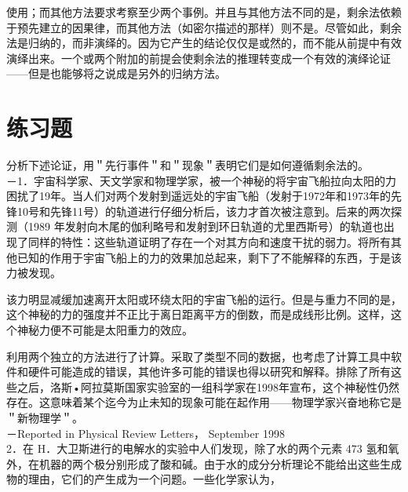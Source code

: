 使用；而其他方法要求考察至少两个事例。并且与其他方法不同的是，剩余法依赖于预先建立的因果律，而其他方法（如密尔描述的那样）则不是。尽管如此，剩余法是归纳的，而非演绎的。因为它产生的结论仅仅是或然的，而不能从前提中有效演绎出来。一个或两个附加的前提会使剩余法的推理转变成一个有效的演绎论证——但是也能够将之说成是另外的归纳方法。

\section*{练习题}
分析下述论证，用＂先行事件＂和＂现象＂表明它们是如何遵循剩余法的。\\
－1．宇宙科学家、天文学家和物理学家，被一个神秘的将宇宙飞船拉向太阳的力困扰了19年。当人们对两个发射到遥远处的宇宙飞船（发射于1972年和1973年的先锋10号和先锋11号）的轨道进行仔细分析后，该力才首次被注意到。后来的两次探测（1989 年发射向木尾的伽利略号和发射到环日轨道的尤里西斯号）的轨道也出现了同样的特性：这些轨道证明了存在一个对其方向和速度干扰的弱力。将所有其他已知的作用于宇宙飞船上的力的效果加总起来，剩下了不能解释的东西，于是该力被发现。

该力明显减缓加速离开太阳或环绕太阳的宇宙飞船的运行。但是与重力不同的是，这个神秘的力的强度并不正比于离日距离平方的倒数，而是成线形比例。这样，这个神秘力便不可能是太阳重力的效应。

利用两个独立的方法进行了计算。采取了类型不同的数据，也考虑了计算工具中软件和硬件可能造成的错误，其他许多可能的错误也得以研究和解释。排除了所有这些之后，洛斯•阿拉莫斯国家实验室的一组科学家在1998年宣布，这个神秘性仍然存在。这意味着某个迄今为止未知的现象可能在起作用——物理学家兴奋地称它是＂新物理学＂。\\
－Reported in Physical Review Letters， September 1998\\
2．在 H．大卫斯进行的电解水的实验中人们发现，除了水的两个元素 473 氢和氧外，在机器的两个极分别形成了酸和碱。由于水的成分分析理论不能给出这些生成物的理由，它们的产生成为一个问题。一些化学家认为，

